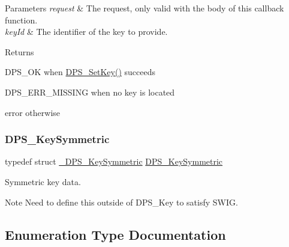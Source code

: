 \begin{DoxyParams}{Parameters}
{\em request} & The request, only valid with the body of this callback function. \\
\hline
{\em key\+Id} & The identifier of the key to provide.\\
\hline
\end{DoxyParams}
\begin{DoxyReturn}{Returns}

\begin{DoxyItemize}
\item D\+P\+S\+\_\+\+OK when \hyperlink{group__keystore_ga15d6a9b8256b67c2ec8b1d365a98dbab}{D\+P\+S\+\_\+\+Set\+Key()} succeeds
\item D\+P\+S\+\_\+\+E\+R\+R\+\_\+\+M\+I\+S\+S\+I\+NG when no key is located
\item error otherwise 
\end{DoxyItemize}
\end{DoxyReturn}
\mbox{\label{group__keystore_ga4c58e71301ab14e675033c601e4eabe1}} 
\subsubsection{\texorpdfstring{D\+P\+S\+\_\+\+Key\+Symmetric}{DPS\_KeySymmetric}}
{\footnotesize\ttfamily typedef struct \hyperlink{struct___d_p_s___key_symmetric}{\+\_\+\+D\+P\+S\+\_\+\+Key\+Symmetric}  \hyperlink{group__keystore_ga4c58e71301ab14e675033c601e4eabe1}{D\+P\+S\+\_\+\+Key\+Symmetric}}



Symmetric key data. 

\begin{DoxyNote}{Note}
Need to define this outside of D\+P\+S\+\_\+\+Key to satisfy S\+W\+IG. 
\end{DoxyNote}


\subsection{Enumeration Type Documentation}
\mbox{\label{group__keystore_ga9ba152af7a3ed9076bfa597ef918cac1}} 

